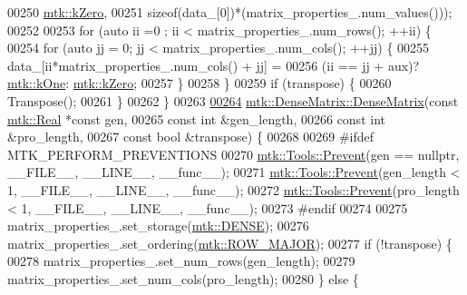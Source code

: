 \begin{DoxyCode}
00250          \hyperlink{group__c01-roots_ga59a451a5fae30d59649bcda274fea271}{mtk::kZero},
00251          \textcolor{keyword}{sizeof}(data\_[0])*(matrix\_properties\_.num\_values()));
00252 
00253   \textcolor{keywordflow}{for} (\textcolor{keyword}{auto} ii =0 ; ii < matrix\_properties\_.num\_rows(); ++ii) \{
00254     \textcolor{keywordflow}{for} (\textcolor{keyword}{auto} jj = 0; jj < matrix\_properties\_.num\_cols(); ++jj) \{
00255       data\_[ii*matrix\_properties\_.num\_cols() + jj] =
00256         (ii == jj + aux)? \hyperlink{group__c01-roots_ga26407c24d43b6b95480943340d285c71}{mtk::kOne}: \hyperlink{group__c01-roots_ga59a451a5fae30d59649bcda274fea271}{mtk::kZero};
00257     \}
00258   \}
00259   \textcolor{keywordflow}{if} (transpose) \{
00260     Transpose();
00261   \}
00262 \}
00263 
\hypertarget{mtk__dense__matrix_8cc_source_l00264}{}\hyperlink{classmtk_1_1DenseMatrix_acedaf4058916614d66a18381e624a21d}{00264} \hyperlink{classmtk_1_1DenseMatrix_a0c75ee704707983f935b02835eab0933}{mtk::DenseMatrix::DenseMatrix}(\textcolor{keyword}{const} \hyperlink{group__c01-roots_gac080bbbf5cbb5502c9f00405f894857d}{mtk::Real} *\textcolor{keyword}{const} gen,
00265                               \textcolor{keyword}{const} \textcolor{keywordtype}{int} &gen\_length,
00266                               \textcolor{keyword}{const} \textcolor{keywordtype}{int} &pro\_length,
00267                               \textcolor{keyword}{const} \textcolor{keywordtype}{bool} &transpose) \{
00268 
00269 \textcolor{preprocessor}{  #ifdef MTK\_PERFORM\_PREVENTIONS}
00270   \hyperlink{classmtk_1_1Tools_a332324c6f25e66be9dff48c5987a3b9f}{mtk::Tools::Prevent}(gen == \textcolor{keyword}{nullptr}, \_\_FILE\_\_, \_\_LINE\_\_, \_\_func\_\_);
00271   \hyperlink{classmtk_1_1Tools_a332324c6f25e66be9dff48c5987a3b9f}{mtk::Tools::Prevent}(gen\_length < 1, \_\_FILE\_\_, \_\_LINE\_\_, \_\_func\_\_);
00272   \hyperlink{classmtk_1_1Tools_a332324c6f25e66be9dff48c5987a3b9f}{mtk::Tools::Prevent}(pro\_length < 1, \_\_FILE\_\_, \_\_LINE\_\_, \_\_func\_\_);
00273 \textcolor{preprocessor}{  #endif}
00274 
00275   matrix\_properties\_.set\_storage(\hyperlink{namespacemtk_ga25b67ec6a2afeee69f9bb196a9c66619a00a806d43a7d74e9ccca47a2134e9c87}{mtk::DENSE});
00276   matrix\_properties\_.set\_ordering(\hyperlink{namespacemtk_ga622801bd9f912d0f976c3e383f5f581cabc55178ac16eb1ce89b5f3ab915a91f3}{mtk::ROW\_MAJOR});
00277   \textcolor{keywordflow}{if} (!transpose) \{
00278     matrix\_properties\_.set\_num\_rows(gen\_length);
00279     matrix\_properties\_.set\_num\_cols(pro\_length);
00280   \} \textcolor{keywordflow}{else} \{

\end{DoxyCode}
